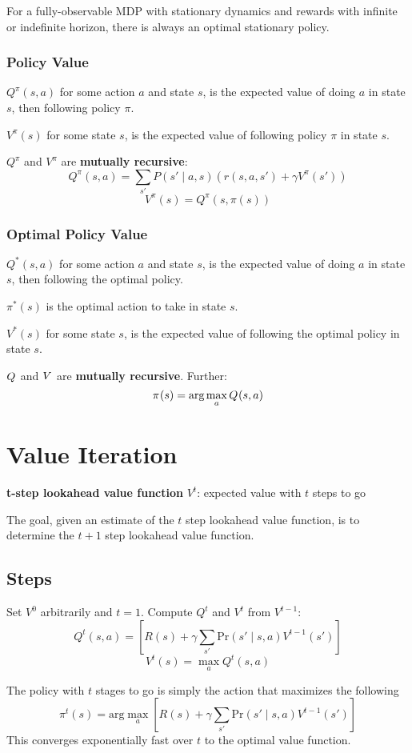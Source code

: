 \documentclass[11pt]{article}
\begin{document}
For a fully-observable MDP with stationary dynamics and rewards with infinite
or indefinite horizon, there is always an optimal stationary policy.
\subsubsection{Policy Value}
\label{sec:org9675169}
\(Q^{\pi}(s, a)\) for some action \(a\) and state \(s\), is the expected value of
doing \(a\) in state \(s\), then following policy \(\pi\).

\(V^{\pi}(s)\) for some state \(s\), is the expected value of following policy
\(\pi\) in state \(s\).

\(Q^{\pi}\) and \(V^{\pi}\) are \textbf{mutually recursive}:
$$ Q^{\pi}(s,a) = \sum_{s'} P(s' \mid a, s) ( r(s, a, s') + \gamma V^{\pi}(s') ) $$
$$ V^{\pi}(s) = Q^{\pi}(s, \pi(s)) $$
\subsubsection{Optimal Policy Value}
\label{sec:org1261ce0}
\(Q^{*}(s, a)\) for some action \(a\) and state \(s\), is the expected value of
doing \(a\) in state \(s\), then following the optimal policy.

\(\pi^{*}(s)\) is the optimal action to take in state \(s\).

\(V^{*}(s)\) for some state \(s\), is the expected value of following the optimal
policy in state \(s\).

\(Q^{\*}\) and \(V^{\*}\) are \textbf{mutually recursive}.
Further:
$$ \pi^{\*}(s) = \text{arg} \max_{a} Q^{\*}(s,a) $$
\section{Value Iteration}
\label{sec:org7e007c3}
\textbf{t-step lookahead value function} \(V^{t}\): expected value with \(t\) steps to go

The goal, given an estimate of the \(t\) step lookahead value function, is to
determine the \(t+1\) step lookahead value function.
\subsection{Steps}
\label{sec:orgeae86b2}
Set \(V^{0}\) arbitrarily and \(t = 1\).
Compute \(Q^{t}\) and \(V^{t}\) from \(V^{t-1}\):
$$ Q^{t}(s,a) = \left[ R(s) + \gamma \sum_{s'} \text{Pr}(s' \mid s, a) V^{t-1} (s') \right] $$
$$ V^{t}(s) = \max_{a} Q^{t} (s,a) $$

The policy with \(t\) stages to go is simply the action that maximizes the following
$$ \pi^{t}(s) = \text{arg} \max_{a} [R(s) + \gamma \sum_{s'} \text{Pr}(s' \mid s, a) V^{t-1}(s')] $$
This converges exponentially fast over \(t\) to the optimal value function.
\end{document}
